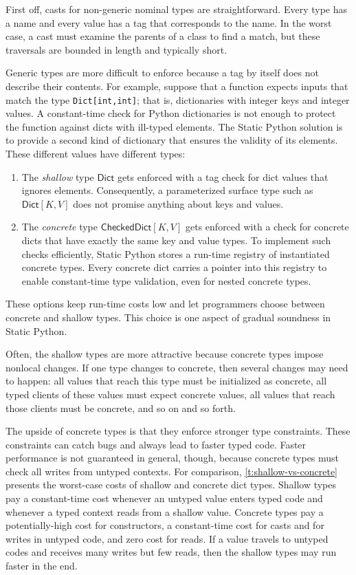 \documentclass[english,cleveref,submission]{programming}
\newcommand{\SP}{Static Python}
\newcommand{\code}[1]{\texttt{#1}}
\newcommand{\typefont}[1]{\mathsf{#1}}
\newcommand{\paramtype}[2]{#1[#2]}
\newcommand{\sptrawpydict}{\typefont{Dict}}
\newcommand{\sptrawchkdict}{\typefont{CheckedDict}} %
\newcommand{\sptpydict}[2]{\paramtype{\sptrawpydict}{#1, #2}}
\newcommand{\sptchkdict}[2]{\paramtype{\sptrawchkdict}{#1, #2}}
\begin{document}
First off, casts for non-generic nominal types are straightforward.
Every type has a name and every value has a tag that corresponds to the name.
In the worst case, a cast must examine the parents of a class to find a match,
but these traversals are bounded in length and typically short.

Generic types are more difficult to enforce because a tag by itself does not
describe their contents.
For example, suppose that a function expects inputs that match
the type \code{Dict[int,int]}; that is, dictionaries with integer keys and
integer values.
A constant-time check for Python dictionaries is not enough to protect the
function against dicts with ill-typed elements.
The \SP{} solution is to provide a second kind of dictionary that ensures
the validity of its elements.
These different values have different types:
\begin{enumerate}
  \item
    The \emph{shallow} type $\sptrawpydict$ gets enforced with a tag check
    for dict values that ignores elements.
    Consequently, a parameterized surface type such as $\sptpydict{K}{V}$
    does not promise anything about keys and values.
  \item
    The \emph{concrete} type $\sptchkdict{K}{V}$ gets enforced with a
    check for concrete dicts that have exactly the same key and value
    types.
    To implement such checks efficiently, \SP{} stores a run-time registry
    of instantiated concrete types.
    Every concrete dict carries a pointer into this registry to enable
    constant-time type validation, even for nested concrete types.
\end{enumerate}
%
These options keep run-time costs low and let programmers choose between
concrete and shallow types.
This choice is one aspect of gradual soundness in \SP{}.

Often, the shallow types are more attractive because concrete types impose
nonlocal changes.
If one type changes to concrete, then several changes may need to happen:
all values that reach this type must be initialized as concrete,
all typed clients of these values must expect concrete values,
all values that reach those clients must be concrete,
and so on and so forth.

The upside of concrete types is that they enforce stronger type constraints.
These constraints can catch bugs and always lead to faster typed code.
Faster performance is not guaranteed in general, though, because concrete types must
check all writes from untyped contexts.
For comparison, \cref{t:shallow-vs-concrete} presents the worst-case costs of
shallow and concrete dict types.
Shallow types pay a constant-time cost whenever an untyped value enters typed code
and whenever a typed context reads from a shallow value.
Concrete types pay a potentially-high cost for constructors,
a constant-time cost for casts and for writes in untyped code,
and zero cost for reads.
If a value travels to untyped codes and receives many writes but few reads,
then the shallow types may run faster in the end.
\end{document}

